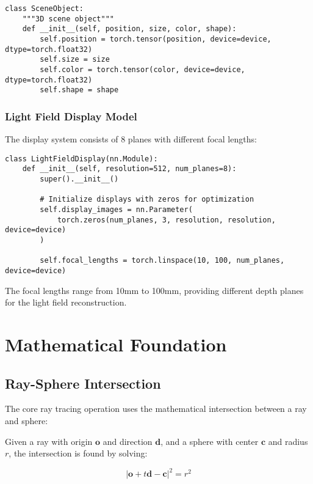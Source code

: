 \documentclass[12pt,a4paper]{article}
\begin{document}
\begin{lstlisting}[caption=Scene Object Definition]
class SceneObject:
    """3D scene object"""
    def __init__(self, position, size, color, shape):
        self.position = torch.tensor(position, device=device, dtype=torch.float32)
        self.size = size
        self.color = torch.tensor(color, device=device, dtype=torch.float32)
        self.shape = shape
\end{lstlisting}

\subsubsection{Light Field Display Model}
The display system consists of 8 planes with different focal lengths:

\begin{lstlisting}[caption=Light Field Display Architecture]
class LightFieldDisplay(nn.Module):
    def __init__(self, resolution=512, num_planes=8):
        super().__init__()
        
        # Initialize displays with zeros for optimization
        self.display_images = nn.Parameter(
            torch.zeros(num_planes, 3, resolution, resolution, device=device)
        )
        
        self.focal_lengths = torch.linspace(10, 100, num_planes, device=device)
\end{lstlisting}

The focal lengths range from 10mm to 100mm, providing different depth planes for the light field reconstruction.

\section{Mathematical Foundation}

\subsection{Ray-Sphere Intersection}

The core ray tracing operation uses the mathematical intersection between a ray and sphere:

Given a ray with origin $\mathbf{o}$ and direction $\mathbf{d}$, and a sphere with center $\mathbf{c}$ and radius $r$, the intersection is found by solving:

\begin{equation}
|\mathbf{o} + t\mathbf{d} - \mathbf{c}|^2 = r^2
\end{equation}
\end{document}
